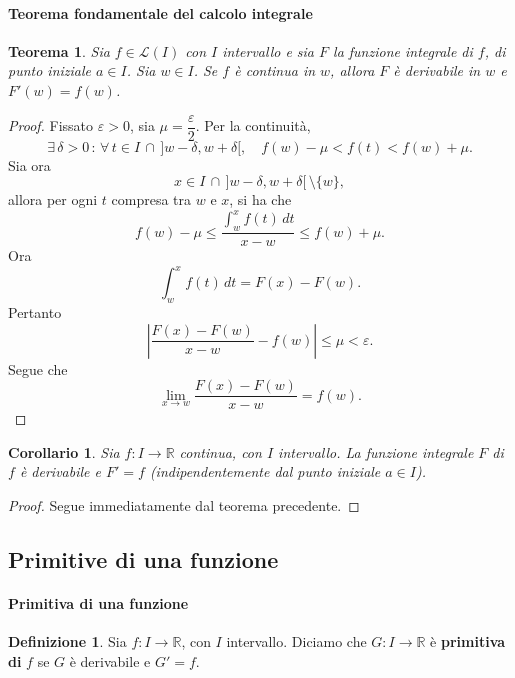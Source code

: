 \documentclass{article}
\theoremstyle{plain}
\newtheorem{thm}{Teorema}[section]
\newtheorem{cor}{Corollario}
\theoremstyle{definition}
\newtheorem{defn}{Definizione}[section]
\theoremstyle{remark}
\begin{document}
\vspace{10pt}

\paragraph{Teorema fondamentale del calcolo integrale}
\begin{bxthm}
\begin{thm}
    Sia $f\in \mathcal{L}(I)$ con $I$ intervallo e sia $F$ la funzione integrale di $f$, di punto iniziale $a\in I$.
    Sia $w\in I$. Se $f$ è continua in $w$, allora $F$ è derivabile in $w$ e $F'(w)=f(w)$.
\end{thm}
\end{bxthm}
\begin{proof}
    Fissato $\varepsilon>0$, sia $\mu=\dfrac{\varepsilon}{2}$.
    Per la continuità, 
    \[\exists\,\delta>0\,:\,\forall\,t\in I\,\cap\, ]w-\delta,w+\delta[,\quad f(w)-\mu<f(t)<f(w)+\mu.\]
    Sia ora \[x\in I\,\cap\, ]w-\delta,w+\delta[\,\setminus\{w\},\]
    allora per ogni $t$ compresa tra $w$ e $x$, si ha che 
    \[f(w)-\mu\leq\dfrac{\int_{w}^{x}f(t)\,dt}{x-w}\leq f(w)+\mu.\]
    Ora \[\int_{w}^{x}f(t)\,dt=F(x)-F(w).\]
    Pertanto \[\left|\dfrac{F(x)-F(w)}{x-w}-f(w)\right|\leq\mu<\varepsilon.\]
    Segue che \[\lim_{x\to w}\dfrac{F(x)-F(w)}{x-w}=f(w).\]
\end{proof}

\vspace{10pt}

\begin{bxthm}
\begin{cor}
    Sia $f:I\to\mathbb{R}$ continua, con $I$ intervallo. La funzione integrale $F$ di $f$ è derivabile e $F'=f$ (indipendentemente dal punto iniziale $a\in I$).
\end{cor}
\end{bxthm}
\begin{proof}
    Segue immediatamente dal teorema precedente.
\end{proof}

\vspace{10pt}

\subsection{Primitive di una funzione}

\vspace{10pt}

\paragraph{Primitiva di una funzione}
\begin{bxthm}
\begin{defn}
    Sia $f:I\to\mathbb{R}$, con $I$ intervallo.
    Diciamo che $G:I\to\mathbb{R}$ è \textbf{primitiva di} $f$ se $G$ è derivabile e $G'=f$.
\end{defn}
\end{bxthm}
\end{document}
